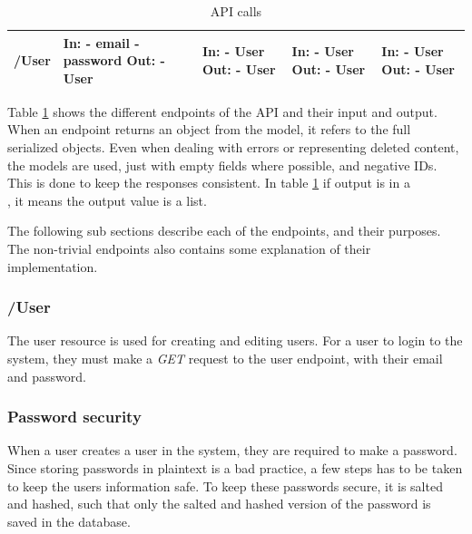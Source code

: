 \begin{table}[H]
\begin{tabular}{|l|p{2cm}|p{2cm}|p{2cm}|p{2cm}|}
         /User & In: \newline - email \newline - password \newline Out: \newline - User & In: \newline - User \newline Out: \newline - User & In: \newline - User \newline Out: \newline - User & In: \newline - User \newline Out: \newline - User \\ \hline
    \end{tabular}
    \caption{API calls}
    \label{table:api}
\end{table}

Table \ref{table:api} shows the different endpoints of the API and their input and output. When an endpoint returns an object from the model, it refers to the full serialized objects. Even when dealing with errors or representing deleted content, the models are used, just with empty fields where possible, and negative IDs. This is done to keep the responses consistent. In table \ref{table:api} if output is in a \[\], it means the output value is a list.

The following sub sections describe each of the endpoints, and their purposes. The non-trivial endpoints also contains some explanation of their implementation.

\subsubsection{/User}
The user resource is used for creating and editing users. For a user to login to the system, they must make a \textit{GET} request to the user endpoint, with their email and password.

\subsubsection{Password security}
When a user creates a user in the system, they are required to make a password. Since storing passwords in plaintext is a bad practice, a few steps has to be taken to keep the users information safe. To keep these passwords secure, it is salted and hashed, such that only the salted and hashed version of the password is saved in the database.

